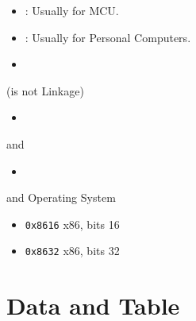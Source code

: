 \begin{itemize}
	\item {}: Usually for MCU.
	\item {}: Usually for Personal Computers.
\end{itemize}

\begin{itemize}
	\item%
\end{itemize}

 (is not Linkage)
\begin{itemize}
	\item%
\end{itemize}

 and 
\begin{itemize}
	\item%
\end{itemize}

 and Operating System
\begin{itemize}
	\item \verb|0x8616| x86, bits 16
	\item \verb|0x8632| x86, bits 32
\end{itemize}

\section{Data and Table}

